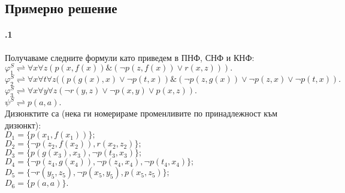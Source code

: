 \documentclass[]{article}
\begin{document}
\subsection{Примерно решение}
\paragraph{\hspace{0.5em} .1}
\begin{addmargin}[1em]{2em}
Получаваме следните формули като приведем в ПНФ, СНФ и КНФ: \\
$\varphi_1^S \rightleftharpoons \forall x \forall z (p(x,f(x))\&(\neg p(z, f(x))\lor r(x,z))). $ \\
$\varphi_2^S \rightleftharpoons \forall x \forall t \forall z((p(g(x),x)\lor \neg p(t,x))\&(\neg p(z, g(x)) \lor \neg p(z,x) \lor \neg p(t,x)). $ \\
$\varphi_3^S \rightleftharpoons \forall x \forall y \forall z (\neg r(y,z) \lor \neg p(x,y) \lor p(x, z)). $ \\
$\psi^S \rightleftharpoons p(a,a).$ \\
Дизюнктите са (нека ги номерираме променливите по принадлежност към дизюнкт): \\
$D_1 = \{ p(x_1,f(x_1))\};$ \\
$D_2 = \{ \neg p(z_2, f(x_2)), r(x_2, z_2)\};$ \\
$D_3 = \{ p(g(x_3), x_3), \neg p(t_3, x_3)\};$ \\
$D_4 = \{ \neg p(z_4,g(x_4)), \neg p(z_4, x_4), \neg p(t_4, x_4)\};$ \\
$D_5 = \{ \neg r(y_5,z_5), \neg p( x_5,y_5), p(x_5, z_5)\};$ \\
$D_6 = \{ p(a,a)\}.$
\end{addmargin}
\end{document}

